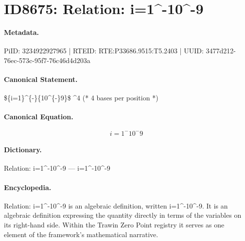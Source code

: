 \section*{ID8675: Relation: i=1\textasciicircum{}-10\textasciicircum{}-9}
\paragraph{Metadata.}
PiID: 3234922927965 | RTEID: RTE:P33686.9515:T5.2403 | UUID: 3477d212-76ec-573c-95f7-76c46d4d203a

\paragraph{Canonical Statement.}
\$\{i=1\}\textasciicircum{}\{-\}\{10\textasciicircum{}\{-\}9\}\$ \textasciicircum{}4 (* 4 bases per position *)

\paragraph{Canonical Equation.}
\[
{i=1}^{-}{10^{-}9}
\]

\paragraph{Dictionary.}
Relation: i=1\textasciicircum{}-10\textasciicircum{}-9 — i=1\textasciicircum{}-10\textasciicircum{}-9

\paragraph{Encyclopedia.}
Relation: i=1\textasciicircum{}-10\textasciicircum{}-9 is an algebraic definition, written i=1\textasciicircum{}-10\textasciicircum{}-9. It is an algebraic definition expressing the quantity directly in terms of the variables on its right-hand side. Within the Trawin Zero Point registry it serves as one element of the framework's mathematical narrative.
